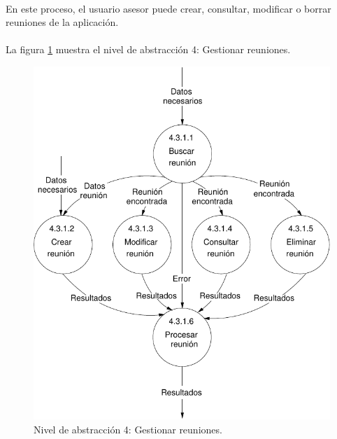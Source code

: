 \paragraph{}En este proceso, el usuario asesor puede crear,
consultar, modificar o borrar reuniones de la aplicación.

\paragraph{}La figura \ref{diagramaNivel4-GestionarReuniones}
muestra el nivel de abstracción 4: Gestionar reuniones.

  \begin{figure}[!ht]
    \begin{center}
      \includegraphics[]{08.Analisis_Funcional/8.2.DFDs/Niveles/Nivel4/Asesor/GestionarReuniones/Diagramas/nivel4-GestionarReuniones.pdf}
      \caption{Nivel de abstracción 4: Gestionar reuniones.}
      \label{diagramaNivel4-GestionarReuniones}
    \end{center}
  \end{figure}
